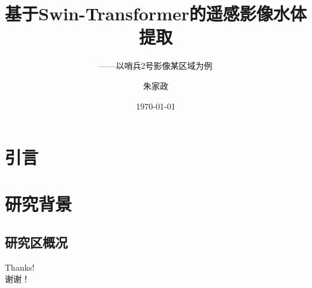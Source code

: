 \documentclass[10pt,aspectratio=169]{beamer} %
\title{基于Swin-Transformer的遥感影像水体提取}
\subtitle{——以哨兵2号影像某区域为例}   %
\author[JiaZheng Zhu]{朱家政}
\institute[Chang'an University]{\large 地球科学与资源学院 \\School of Geosciences \& Resources}
\date{\today}
\begin{document}
	
	\maketitle
	
	\section{引言}
		\begin{frame}[c]{\secname}


	\end{frame}
	\section{研究背景}
	\subsection{研究区概况}
		\begin{frame}[c]{\secname}{\subsecname}
	
	\end{frame}

	
	
		\begin{frame}%
		\vfill
		\centering
		{
			\centering \Huge \color{white} Thanks! \\谢谢！
		}
		\vfill
	\end{frame}
\end{document}
